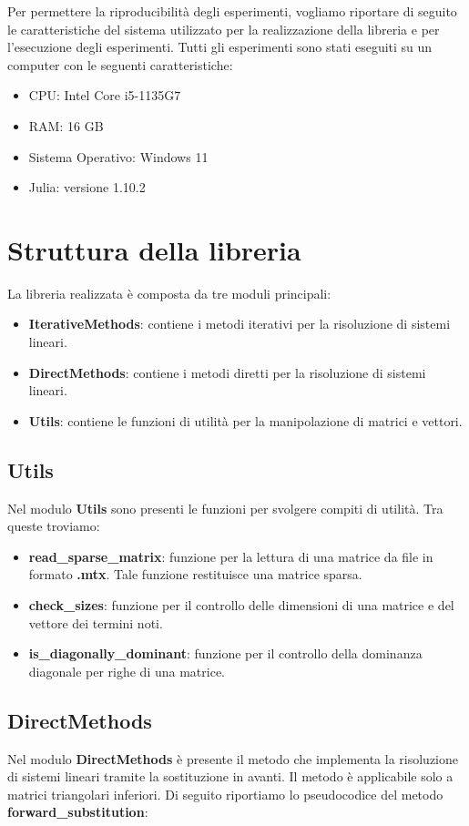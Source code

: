 Per permettere la riproducibilità degli esperimenti, vogliamo riportare di seguito
le caratteristiche del sistema utilizzato per la realizzazione della libreria e
per l'esecuzione degli esperimenti. Tutti gli esperimenti sono stati eseguiti su
un computer con le seguenti caratteristiche:
\begin{itemize}
    \item CPU: Intel Core i5-1135G7
    \item RAM: 16 GB
    \item Sistema Operativo: Windows 11
    \item Julia: versione 1.10.2
\end{itemize}
\section{Struttura della libreria}
La libreria realizzata è composta da tre moduli principali:
\begin{itemize}
    \item \textbf{IterativeMethods}: contiene i metodi iterativi per la risoluzione
          di sistemi lineari.
    \item \textbf{DirectMethods}: contiene i metodi diretti per la risoluzione
          di sistemi lineari.
    \item \textbf{Utils}: contiene le funzioni di utilità per la manipolazione
          di matrici e vettori.
\end{itemize}

\subsection{Utils}
Nel modulo \textbf{Utils} sono presenti le funzioni per svolgere compiti di
utilità. Tra queste troviamo:
\begin{itemize}
    \item \textbf{read\_sparse\_matrix}: funzione per la lettura di una matrice
          da file in formato \textbf{.mtx}. Tale funzione restituisce una matrice
          sparsa.
    \item \textbf{check\_sizes}: funzione per il controllo delle dimensioni di
          una matrice e del vettore dei termini noti.
    \item \textbf{is\_diagonally\_dominant}: funzione per il controllo della
          dominanza diagonale per righe di una matrice.
\end{itemize}
\subsection{DirectMethods}
Nel modulo \textbf{DirectMethods} è presente il metodo che implementa
la risoluzione di sistemi lineari tramite la sostituzione in avanti. Il metodo
è applicabile solo a matrici triangolari inferiori. Di seguito riportiamo lo
pseudocodice del metodo \textbf{forward\_substitution}:

